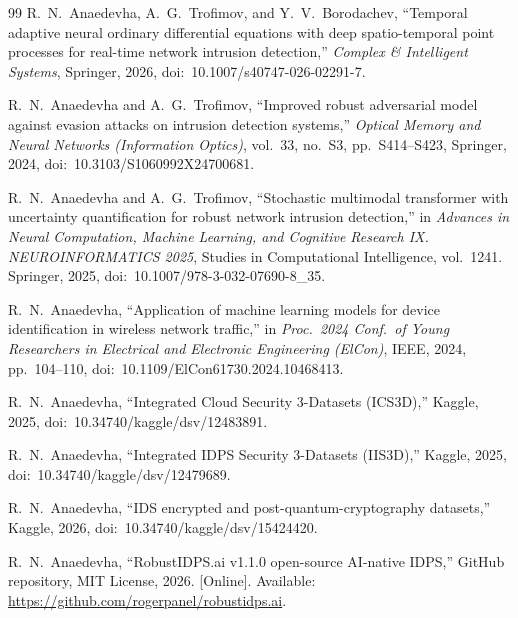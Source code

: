 \documentclass{ieeeaccess}
\begin{document}
\begin{thebibliography}{99}
 R.~N.~Anaedevha, A.~G.~Trofimov, and
Y.~V.~Borodachev, ``Temporal adaptive neural ordinary differential
equations with deep spatio-temporal point processes for real-time
network intrusion detection,'' \emph{Complex \& Intelligent Systems},
Springer, 2026, doi:~10.1007/s40747-026-02291-7.

 R.~N.~Anaedevha and A.~G.~Trofimov,
``Improved robust adversarial model against evasion attacks on
intrusion detection systems,'' \emph{Optical Memory and Neural
Networks (Information Optics)}, vol.~33, no.~S3, pp.~S414--S423,
Springer, 2024, doi:~10.3103/S1060992X24700681.

 R.~N.~Anaedevha and A.~G.~Trofimov,
``Stochastic multimodal transformer with uncertainty quantification
for robust network intrusion detection,'' in \emph{Advances in Neural
Computation, Machine Learning, and Cognitive Research IX.
NEUROINFORMATICS 2025}, Studies in Computational Intelligence,
vol.~1241. Springer, 2025,
doi:~10.1007/978-3-032-07690-8\_35.

 R.~N.~Anaedevha, ``Application of machine
learning models for device identification in wireless network
traffic,'' in \emph{Proc.\ 2024 Conf.\ of Young Researchers in
Electrical and Electronic Engineering (ElCon)}, IEEE, 2024,
pp.~104--110, doi:~10.1109/ElCon61730.2024.10468413.

 R.~N.~Anaedevha, ``Integrated Cloud Security
3-Datasets (ICS3D),'' Kaggle, 2025,
doi:~10.34740/kaggle/dsv/12483891.

 R.~N.~Anaedevha, ``Integrated IDPS Security
3-Datasets (IIS3D),'' Kaggle, 2025,
doi:~10.34740/kaggle/dsv/12479689.

 R.~N.~Anaedevha, ``IDS encrypted and
post-quantum-cryptography datasets,'' Kaggle, 2026,
doi:~10.34740/kaggle/dsv/15424420.

 R.~N.~Anaedevha,
``RobustIDPS.ai v1.1.0 open-source AI-native IDPS,''
GitHub repository, MIT License, 2026.
[Online]. Available: \url{https://github.com/rogerpanel/robustidps.ai}.

\end{thebibliography}

\vspace{-1.0cm}
\end{document}
